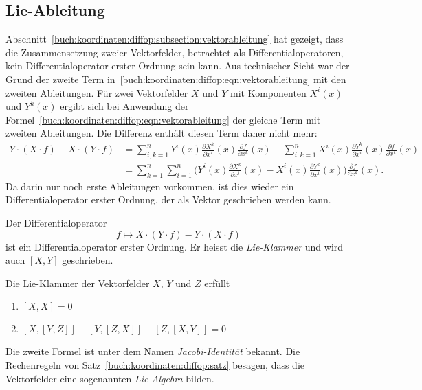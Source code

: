 %
%
\subsection{Lie-Ableitung}
Abschnitt~\ref{buch:koordinaten:diffop:subsection:vektorableitung}
hat gezeigt, dass die Zusammensetzung zweier Vektorfelder, betrachtet
als Differentialoperatoren, kein Differentialoperator erster Ordnung
sein kann.
Aus technischer Sicht war der Grund der zweite Term 
in~\eqref{buch:koordinaten:diffop:eqn:vektorableitung}
mit den zweiten Ableitungen.
Für zwei Vektorfelder $X$ und $Y$ mit Komponenten $X^i(x)$ und
$Y^k(x)$ ergibt sich bei Anwendung der
Formel~\eqref{buch:koordinaten:diffop:eqn:vektorableitung}
der gleiche Term mit zweiten Ableitungen.
Die Differenz enthält diesen Term daher nicht mehr:
\begin{align*}
Y\cdot(X\cdot f)
-
X\cdot(Y\cdot f)
&=
\sum_{i,k=1}^n
Y^i(x)\frac{\partial X^k}{\partial x^i}(x) \frac{\partial f}{\partial x^k}(x)
-
\sum_{i,k=1}^n
X^i(x)\frac{\partial Y^k}{\partial x^i}(x) \frac{\partial f}{\partial x^k}(x)
\\
&=
\sum_{k=1}^n
\sum_{i=1}^n
\biggl(
Y^i(x)\frac{\partial X^k}{\partial x^i}(x)
-
X^i(x)\frac{\partial Y^k}{\partial x^i}(x)
\biggr)
\frac{\partial f}{\partial x^k}(x).
\end{align*}
Da darin nur noch erste Ableitungen vorkommen, ist dies wieder
ein Differentialoperator erster Ordnung, der als Vektor
geschrieben werden kann.

\begin{definition}
\label{buch:koordinaten:diffop:def:lieableitung}
%
Der Differentialoperator 
\[
f\mapsto
X\cdot(Y\cdot f)
-
Y\cdot(X\cdot f)
\]
ist ein Differentialoperator erster Ordnung.
Er heisst die {\em Lie-Klammer} und wird auch $[X,Y]$
geschrieben.
\end{definition}

\begin{satz}
\label{buch:koordinaten:diffop:satz}
%
Die Lie-Klammer der Vektorfelder $X$, $Y$ und $Z$ erfüllt
\begin{enumerate}
\item $[X,X]=0$
\item $[X, [Y, Z]] + [Y, [Z, X]] + [Z, [X, Y]] = 0$
\end{enumerate}
\end{satz}

Die zweite Formel ist unter dem Namen {\em Jacobi-Identität} bekannt.
Die Rechenregeln von Satz~\ref{buch:koordinaten:diffop:satz} besagen,
dass die Vektorfelder eine sogenannten {\em Lie-Algebra} bilden.

